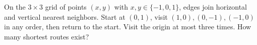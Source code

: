 On the $3\times3$ grid of points $(x,y)$ with $x,y\in\{-1,0,1\}$, edges join horizontal and vertical nearest neighbors. Start at $(0,1)$, visit $(1,0),(0,-1),(-1,0)$ in any order, then return to the start. Visit the origin at most three times. How many shortest routes exist?
